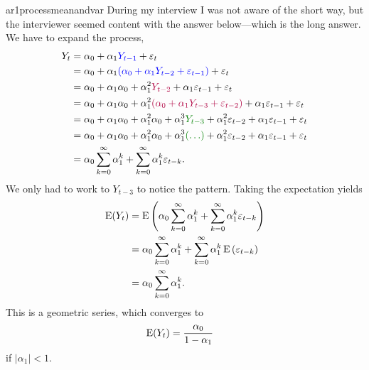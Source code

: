 \begin{answer}{ar1processmeanandvar}
During my interview I was not aware of the short way, but the interviewer seemed content with the answer below---which is the long answer.
We have to expand the process,
\begin{align*}
  Y_t &=
  \alpha_0 + \alpha_1
  \textcolor{blue}{Y_{t-1}} + \varepsilon_{t} \\
      &=
  \alpha_0 + \alpha_1
  \textcolor{blue}{(
  \alpha_0 + \alpha_1 Y_{t-2} + \varepsilon_{t-1}
  )}
                       + \varepsilon_{t} \\
      &=
  \alpha_0 + \alpha_1
  \alpha_0 + \alpha_1^2 \textcolor{dwred}{Y_{t-2}} + \alpha_1\varepsilon_{t-1}
                       + \varepsilon_{t} \\
      &=
  \alpha_0 + \alpha_1
  \alpha_0 + \alpha_1^2
  \textcolor{dwred}{(
  \alpha_0 + \alpha_1 Y_{t-3} + \varepsilon_{t-2}
  )
  }
                         + \alpha_1\varepsilon_{t-1}
                        + \varepsilon_{t} \\
      &=
  \alpha_0 + \alpha_1
  \alpha_0 + \alpha_1^2
  \alpha_0 + \alpha_1^3 \textcolor{dwgreen}{Y_{t-3}} + \alpha_1^2\varepsilon_{t-2}
                        + \alpha_1\varepsilon_{t-1}
                        + \varepsilon_{t} \\
      &=
  \alpha_0 + \alpha_1
  \alpha_0 + \alpha_1^2
  \alpha_0 + \alpha_1^3
  \textcolor{dwgreen}{(\ldots)} + \alpha_1^2\varepsilon_{t-2}
                        + \alpha_1\varepsilon_{t-1}
                        + \varepsilon_{t} \\
      &=
  \alpha_0
  \sum_{k=0}^{\infty}
  {\alpha_1^k}
  +
  \sum_{k=0}^{\infty}{
    \alpha_1^k
    \varepsilon_{t-k}
    }
    \text{.}
\end{align*}
We only had to work to
$Y_{t-3}$
to notice the pattern.
Taking the expectation yields
\begin{align*}
\operatorname{\mathrm{E}}(Y_t)
&=
\operatorname{\mathrm{E}}\left(
  \alpha_0
  \sum_{k=0}^{\infty}
  {\alpha_1^k}
  +
  \sum_{k=0}^{\infty}{
    \alpha_1^k
    \varepsilon_{t-k}
    }
    \right) \\
&=
  \alpha_0
  \sum_{k=0}^{\infty}
  {\alpha_1^k}
  +
  \sum_{k=0}^{\infty}{
    \alpha_1^k
\operatorname{\mathrm{E}}\left(
    \varepsilon_{t-k}
    \right)
    } \\
&=
  \alpha_0
  \sum_{k=0}^{\infty}
  {\alpha_1^k}
  \text{.}
\end{align*}
This is a geometric series, which converges to
\begin{align*}
\operatorname{\mathrm{E}}(Y_t)
&=
  \frac{\alpha_0}{1-\alpha_1}
\end{align*}
if
$|\alpha_1| < 1$.

\end{answer}
